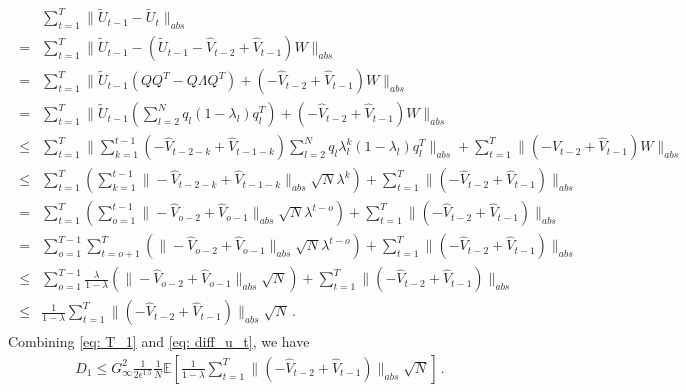 \documentclass{article} %
\begin{document}
\begin{align}\label{eq: diff_u_t}
\begin{split}
& \sum_{t=1}^T   \|{{\tilde U_{t-1}}} - {{\tilde U_{t}}\|_{abs}}  \\
= &       \sum_{t=1}^T   \|{{\tilde U_{t-1}}} - (\tilde U_{t-1}  - \hat V_{t-2} + \hat V_{t-1})W \|_{abs}      \\
= &   \sum_{t=1}^T   \|\tilde U_{t-1}(QQ^T-Q\Lambda Q^T)  + (- \hat V_{t-2} + \hat V_{t-1})W \|_{abs}   \\
= &  \sum_{t=1}^T   \|\tilde U_{t-1}(\sum_{l=2}^N q_l (1-\lambda_l)q_l^T)  + (- \hat V_{t-2} + \hat V_{t-1})W\|_{abs}     \\
\leq &  \sum_{t=1}^T   \| \sum_{k=1}^{t-1} (- \hat V_{t-2-k} + \hat V_{t-1-k} ) \sum_{l=2}^N q_l \lambda_l^k  (1-\lambda_l)q_l^T  \|_{abs} + \sum_{t=1}^T  \| (- \hat V_{t-2} + \hat V_{t-1})W \|_{abs}      \\
\leq &   \sum_{t=1}^T  \left(  \sum_{k=1}^{t-1} \|- \hat V_{t-2-k} + \hat V_{t-1-k}\|_{abs} \sqrt{N}\lambda^k \right)   + \sum_{t=1}^T  \| ( - \hat V_{t-2} + \hat V_{t-1}) \|_{abs}   \\
=  &  \sum_{t=1}^T  \left(  \sum_{o=1}^{t-1} \|- \hat V_{o-2} + \hat V_{o-1}\|_{abs} \sqrt{N}\lambda^{t-o} \right)   + \sum_{t=1}^T  \| ( - \hat V_{t-2} + \hat V_{t-1}) \|_{abs}      \\
=  &\sum_{o=1}^{T-1}  \sum_{t=o+1}^T  \left(   \|- \hat V_{o-2} + \hat V_{o-1}\|_{abs} \sqrt{N}\lambda^{t-o} \right)   + \sum_{t=1}^T  \| ( - \hat V_{t-2} + \hat V_{t-1}) \|_{abs}    \\
\leq &\sum_{o=1}^{T-1} \frac{\lambda}{1-\lambda}   \left(   \|- \hat V_{o-2} + \hat V_{o-1}\|_{abs} \sqrt{N}  \right)   + \sum_{t=1}^T  \| ( - \hat V_{t-2} + \hat V_{t-1}) \|_{abs}    \\
\leq & \frac{1}{1-\lambda}   \sum_{t=1}^T  \| ( - \hat V_{t-2} + \hat V_{t-1}) \|_{abs}  \sqrt{N}    \, .
\end{split}
\end{align}
Combining \eqref{eq: T_1} and \eqref{eq: diff_u_t}, we have
\begin{align}
D_1 \leq G_{\infty}^2 \frac{1}{2\epsilon^{1.5}} \frac{1}{N}   \mathbb E \left [  \frac{1}{1-\lambda}   \sum_{t=1}^T  \| ( - \hat V_{t-2} + \hat V_{t-1}) \|_{abs}  \sqrt{N} \right]\, .
\end{align}
\end{document}
